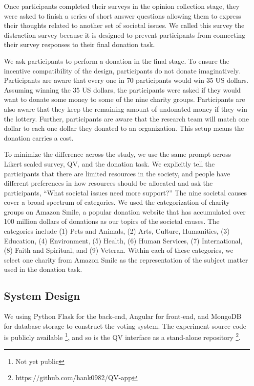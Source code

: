 Once participants completed their surveys in the opinion collection stage, they were asked to finish a series of short answer questions allowing them to express their thoughts related to another set of societal issues.
We called this survey the distraction survey because it is designed to prevent participants from connecting their survey responses to their final donation task.

We ask participants to perform a donation in the final stage. 
To ensure the incentive compatibility of the design, participants do not donate imaginatively.
Participants are aware that every one in 70 participants would win 35 US dollars.
Assuming winning the 35 US dollars, the participants were asked if they would want to donate some money to some of the nine charity groups.
Participants are also aware that they keep the remaining amount of undonated money if they win the lottery.
Further, participants are aware that the research team will match one dollar to each one dollar they donated to an organization. 
This setup means the donation carries a cost.

To minimize the difference across the study, we use the same prompt across Likert scaled survey, QV, and the donation task.
We explicitly tell the participants that there are limited resources in the society, and people have different preferences in how resources should be allocated and ask the participants, ``What societal issues need more support?''
The nine societal causes cover a broad spectrum of categories.
We used the categorization of charity groups on Amazon Smile, a popular donation website that has accumulated over 100 million dollars of donations as our topics of the societal causes.
The categories include (1) Pets and Animals, (2) Arts, Culture, Humanities, (3) Education, (4) Environment, (5) Health, (6) Human Services, (7) International, (8) Faith and Spiritual, and (9) Veteran. 
Within each of these categories, we select one charity from Amazon Smile as the representation of the subject matter used in the donation task.

\subsection{System Design}
We using Python Flask for the back-end, Angular for front-end, and MongoDB for database storage to construct the voting system. 
The experiment source code is publicly available \footnote{Not yet public}, and so is the QV interface as a stand-alone repository \footnote{https://github.com/hank0982/QV-app}.

